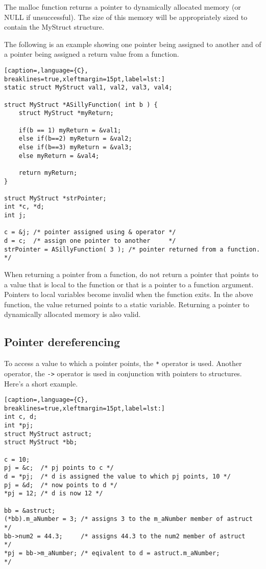 The malloc function returns a pointer to dynamically allocated memory (or NULL
if unsuccessful). The size of this memory will be appropriately sized to
contain the MyStruct structure.

The following is an example showing one pointer being assigned to another and
of a pointer being assigned a return value from a function.
\lstset{basicstyle=\scriptsize, numbers=left, captionpos=b, tabsize=4}
\begin{lstlisting}[caption=,language={C},
breaklines=true,xleftmargin=15pt,label=lst:]
static struct MyStruct val1, val2, val3, val4;

struct MyStruct *ASillyFunction( int b ) {
	struct MyStruct *myReturn;
	
	if(b == 1) myReturn = &val1;
	else if(b==2) myReturn = &val2;
	else if(b==3) myReturn = &val3;
	else myReturn = &val4;
	
	return myReturn;
}

struct MyStruct *strPointer;
int *c, *d;
int j;

c = &j; /* pointer assigned using & operator */
d = c;  /* assign one pointer to another     */
strPointer = ASillyFunction( 3 ); /* pointer returned from a function. */
\end{lstlisting}

When returning a pointer from a function, do not return a pointer that points
to a value that is local to the function or that is a pointer to a function
argument. Pointers to local variables become invalid when the function exits.
In the above function, the value returned points to a static variable.
Returning a pointer to dynamically allocated memory is also valid.

\subsection{Pointer dereferencing}
To access a value to which a pointer points, the \texttt{*} operator is used.
Another operator, the \texttt{-\textgreater{}} operator is used in conjunction
with pointers to structures. Here's a short example.
\lstset{basicstyle=\scriptsize, numbers=left, captionpos=b, tabsize=4}
\begin{lstlisting}[caption=,language={C},
breaklines=true,xleftmargin=15pt,label=lst:]
int c, d;
int *pj;
struct MyStruct astruct;
struct MyStruct *bb;

c = 10;
pj = &c;  /* pj points to c */
d = *pj;  /* d is assigned the value to which pj points, 10 */
pj = &d;  /* now points to d */
*pj = 12; /* d is now 12 */

bb = &astruct;
(*bb).m_aNumber = 3; /* assigns 3 to the m_aNumber member of astruct */
bb->num2 = 44.3;     /* assigns 44.3 to the num2 member of astruct   */
*pj = bb->m_aNumber; /* eqivalent to d = astruct.m_aNumber;          */
\end{lstlisting}

